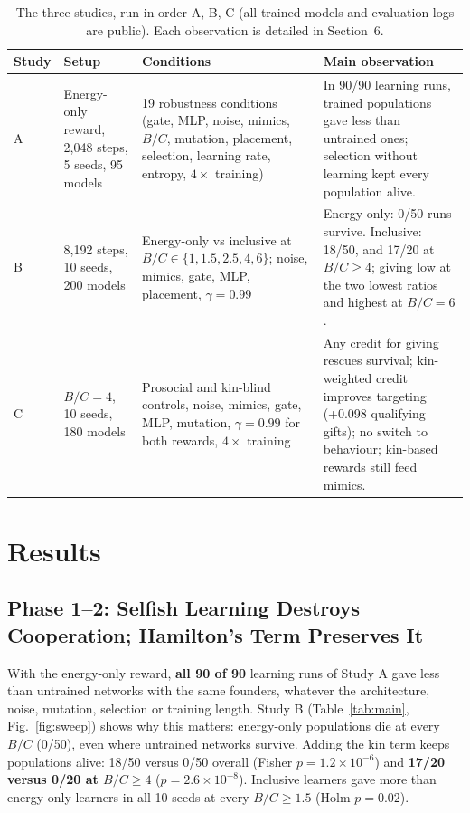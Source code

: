 \documentclass{article}
\begin{document}
\begin{table}[!htbp]
\centering
\caption{The three studies, run in order A, B, C (all trained models and evaluation logs are public). Each observation is detailed in Section~6.}
\label{tab:studies}
\small
\begin{tabular}{p{}p{}p{}p{}}
\toprule
\textbf{Study} & \textbf{Setup} & \textbf{Conditions} & \textbf{Main observation} \\
\midrule
A & Energy-only reward, 2{,}048 steps, 5 seeds, 95 models & 19 robustness conditions (gate, MLP, noise, mimics, $B/C$, mutation, placement, selection, learning rate, entropy, $4\times$ training) & In 90/90 learning runs, trained populations gave less than untrained ones; selection without learning kept every population alive. \\
B & 8{,}192 steps, 10 seeds, 200 models & Energy-only vs inclusive at $B/C\in\{1,1.5,2.5,4,6\}$; noise, mimics, gate, MLP, placement, $\gamma=0.99$ & Energy-only: 0/50 runs survive. Inclusive: 18/50, and 17/20 at $B/C\ge4$; giving low at the two lowest ratios and highest at $B/C=6$. \\
C & $B/C=4$, 10 seeds, 180 models & Prosocial and kin-blind controls, noise, mimics, gate, MLP, mutation, $\gamma=0.99$ for both rewards, $4\times$ training & Any credit for giving rescues survival; kin-weighted credit improves targeting (+0.098 qualifying gifts); no switch to behaviour; kin-based rewards still feed mimics. \\
\bottomrule
\end{tabular}
\end{table}

\section{Results}

\subsection{Phase 1--2: Selfish Learning Destroys Cooperation; Hamilton's Term Preserves It}
With the energy-only reward, \textbf{all 90 of 90} learning runs of Study A gave less than untrained networks with the same founders, whatever the architecture, noise, mutation, selection or training length. Study B (Table~\ref{tab:main}, Fig.~\ref{fig:sweep}) shows why this matters: energy-only populations die at every $B/C$ (0/50), even where untrained networks survive. Adding the kin term keeps populations alive: 18/50 versus 0/50 overall (Fisher $p=1.2\times10^{-6}$) and \textbf{17/20 versus 0/20 at $B/C\ge4$} ($p=2.6\times10^{-8}$). Inclusive learners gave more than energy-only learners in all 10 seeds at every $B/C\ge1.5$ (Holm $p=0.02$).
\end{document}
